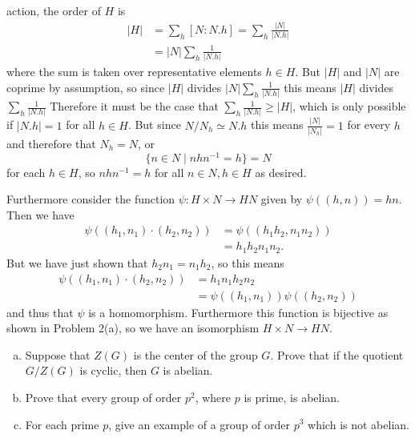 \documentclass{article}
\newcounter{Problem}
\newenvironment{Problem}{\begin{Exercise}[name={Problem},
                                          counter={Problem}]}
                        {\end{Exercise}}
\begin{document}
\begin{Answer}
\begin{enumerate}[(a)]
{    action, the order of $H$ is
    \begin{align*}
    |H| &= \sum_h [N : N . h] = \sum_h \frac{|N|}{|N . h|} \\
        &= |N| \sum_h \frac{1}{|N . h|}
    \end{align*}
    where the sum is taken over representative elements $h \in H$.
    But $|H|$ and $|N|$ are coprime by assumption, so since $|H|$ divides
    $|N| \sum_h \frac{1}{|N . h|}$ this means $|H|$ divides
    $\sum_h \frac{1}{|N . h|}$ Therefore it must be the case that
    $\sum_h \frac{1}{|N . h|} \geq |H|$, which is only possible if
    $|N . h| = 1$ for all $h \in H$. But since $N / N_h \simeq N . h$
    this means $\frac{|N|}{|N_h|} = 1$ for every $h$ and therefore
    that $N_h = N$, or
    $$
    \{ n \in N \mid n h n^{-1} = h \} = N
    $$
    for each $h \in H$, so $n h n^{-1} = h$ for all $n \in N, h \in H$
    as desired.

    Furthermore consider the function
    $\psi : H \times N \to HN$ given by $\psi((h, n)) = h n$. Then we
    have
    \begin{align*}
       \psi((h_1, n_1) \cdot (h_2, n_2))
    &= \psi((h_1 h_2, n_1 n_2)) \\
    &= h_1 h_2 n_1 n_2.
    \end{align*}
    But we have just shown that $h_2 n_1 = n_1 h_2$, so this means
    \begin{align*}
       \psi((h_1, n_1) \cdot (h_2, n_2))
    &= h_1 n_1 h_2 n_2 \\
    &= \psi((h_1, n_1)) \psi((h_2, n_2))
    \end{align*}
    and thus that $\psi$ is a homomorphism. Furthermore this function
    is bijective as shown in Problem 2(a), so we have an isomorphism
    $H \times N \to HN$.
  }
\end{enumerate}
\end{Answer}

\pagebreak

\begin{Problem}
\begin{enumerate}[(a)]
  \item{Suppose that $Z(G)$ is the center of the group $G$. Prove that if
      the quotient $G / Z(G)$ is cyclic, then $G$ is abelian.}
  \item{Prove that every group of order $p^2$, where $p$ is prime, is
      abelian.}
  \item{For each prime $p$, give an example of a group of order $p^3$
      which is not abelian.}
\end{enumerate}
\end{Problem}
\end{document}
